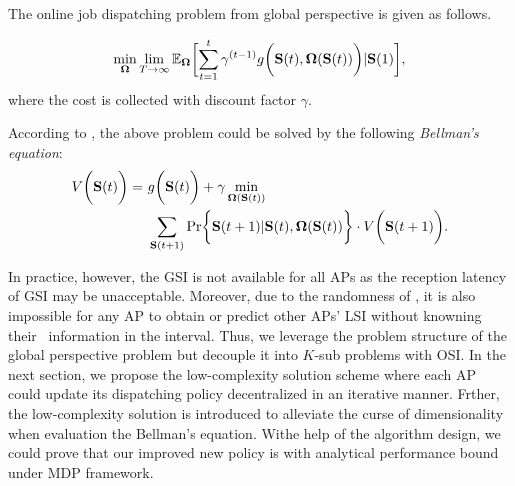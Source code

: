 The online job dispatching problem from global perspective is given as follows.
\begin{problem}
    \begin{align}
        \min_{\Policy} \lim_{T \to \infty}
            \mathbb{E}_{\Policy}
                \Bracket{ \sum_{t=1}^t \gamma^{(t-1)} g\Paren{\Stat(t), \Policy(\Stat(t))} | \Stat(1) },
    \end{align}
    where the cost is collected with discount factor $\gamma$.
    \label{problem_1}
\end{problem}
According to \cite{sutton1998introduction}, the above problem could be solved by the following \emph{Bellman's equation}:
\begin{align}
    V\Paren{\Stat(t)} =~&g\Paren{\Stat(t)} + \gamma \min_{\Policy(\Stat(t))}
        \nonumber\\
        &\sum_{\Stat(t+1)} \Pr\Brace{ \Stat(t+1)|\Stat(t), \Policy(\Stat(t)) } \cdot V\Paren{\Stat(t+1)}.
    \label{eqn:sp_0}
\end{align}

In practice, however, the GSI is not available for all APs as the reception latency of GSI may be unacceptable.
Moreover, due to the randomness of \brlatency, it is also impossible for any AP to obtain or predict other APs' LSI without knowning their \brlatency~information in the interval.
Thus, we leverage the problem structure of the global perspective problem but decouple it into $K$-sub problems
with OSI.
In the next section, we propose the low-complexity solution scheme where each AP could update its dispatching policy decentralized in an iterative manner.
Frther, the low-complexity solution is introduced to alleviate the curse of dimensionality when evaluation the Bellman's equation.
Withe help of the algorithm design, we could prove that our improved new policy is with analytical performance bound under MDP framework.

